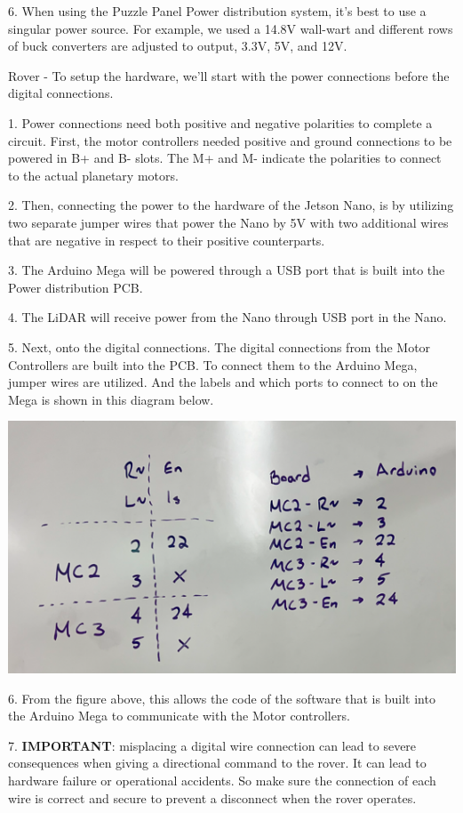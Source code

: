 \documentclass[a4paper, 10pt]{article}
\begin{document}
6. When using the Puzzle Panel Power distribution system, it's best to use a singular power source. For example, we used a 14.8V wall-wart and different rows of buck converters are adjusted to output, 3.3V, 5V, and 12V.

Rover - To setup the hardware, we'll start with the power connections before the digital connections.

1. Power connections need both positive and negative polarities to complete a circuit. First, the motor controllers needed positive and ground connections to be powered in B+ and B- slots. The M+ and M- indicate the polarities to connect to the actual planetary motors. 

2. Then, connecting the power to the hardware of the Jetson Nano, is by utilizing two separate jumper wires that power the Nano by 5V with two additional wires that are negative in respect to their positive counterparts.  

3. The Arduino Mega will be powered through a USB port that is built into the Power distribution PCB.

4. The LiDAR will receive power from the Nano through USB port in the Nano.

5. Next, onto the digital connections. The digital connections from the Motor Controllers are built into the PCB. To connect them to the Arduino Mega, jumper wires are utilized. And the labels and which ports to connect to on the Mega is shown in this diagram below.

\includegraphics[scale=0.6]{Digital Connections from Motor Controller to Arduino Mega}

6. From the figure above, this allows the code of the software that is built into the Arduino Mega to communicate with the Motor controllers.

7. \textbf{IMPORTANT}: misplacing a digital wire connection can lead to severe consequences when giving a directional command to the rover. It can lead to hardware failure or operational accidents. So make sure the connection of each wire is correct and secure to prevent a disconnect when the rover operates.
\end{document}
